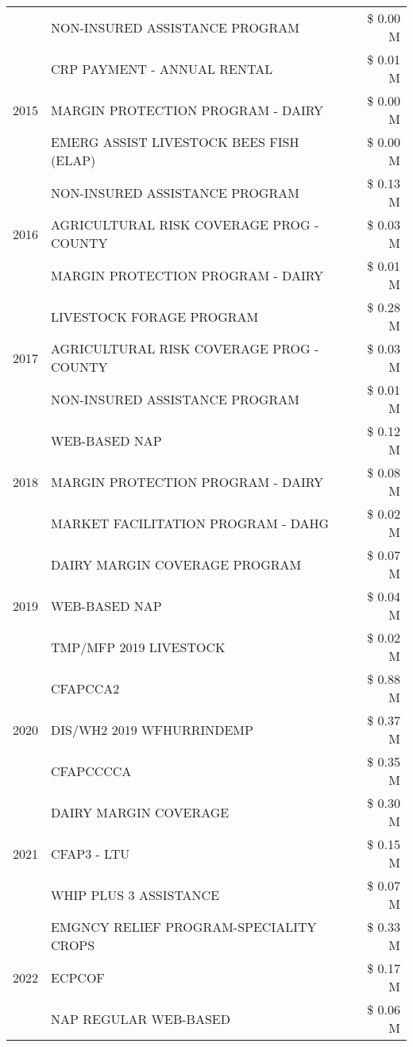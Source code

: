 \begin{tabular}{llr}
 & NON-INSURED ASSISTANCE PROGRAM & \$ 0.00 M \\
\cline{1-3}
\multirow[t]{3}{*}{2015} & CRP PAYMENT - ANNUAL RENTAL & \$ 0.01 M \\
 & MARGIN PROTECTION PROGRAM - DAIRY & \$ 0.00 M \\
 & EMERG ASSIST LIVESTOCK BEES FISH (ELAP) & \$ 0.00 M \\
\cline{1-3}
\multirow[t]{3}{*}{2016} & NON-INSURED ASSISTANCE PROGRAM & \$ 0.13 M \\
 & AGRICULTURAL RISK COVERAGE PROG - COUNTY & \$ 0.03 M \\
 & MARGIN PROTECTION PROGRAM - DAIRY & \$ 0.01 M \\
\cline{1-3}
\multirow[t]{3}{*}{2017} & LIVESTOCK FORAGE PROGRAM & \$ 0.28 M \\
 & AGRICULTURAL RISK COVERAGE PROG - COUNTY & \$ 0.03 M \\
 & NON-INSURED ASSISTANCE PROGRAM & \$ 0.01 M \\
\cline{1-3}
\multirow[t]{3}{*}{2018} & WEB-BASED NAP & \$ 0.12 M \\
 & MARGIN PROTECTION PROGRAM - DAIRY & \$ 0.08 M \\
 & MARKET FACILITATION PROGRAM - DAHG & \$ 0.02 M \\
\cline{1-3}
\multirow[t]{3}{*}{2019} & DAIRY MARGIN COVERAGE PROGRAM & \$ 0.07 M \\
 & WEB-BASED NAP & \$ 0.04 M \\
 & TMP/MFP 2019 LIVESTOCK & \$ 0.02 M \\
\cline{1-3}
\multirow[t]{3}{*}{2020} & CFAPCCA2 & \$ 0.88 M \\
 & DIS/WH2 2019 WFHURRINDEMP & \$ 0.37 M \\
 & CFAPCCCCA & \$ 0.35 M \\
\cline{1-3}
\multirow[t]{3}{*}{2021} & DAIRY MARGIN COVERAGE & \$ 0.30 M \\
 & CFAP3 - LTU & \$ 0.15 M \\
 & WHIP PLUS 3 ASSISTANCE & \$ 0.07 M \\
\cline{1-3}
\multirow[t]{3}{*}{2022} & EMGNCY RELIEF PROGRAM-SPECIALITY CROPS & \$ 0.33 M \\
 & ECPCOF & \$ 0.17 M \\
 & NAP REGULAR WEB-BASED & \$ 0.06 M \\
\cline{1-3}
\bottomrule
\end{tabular}
